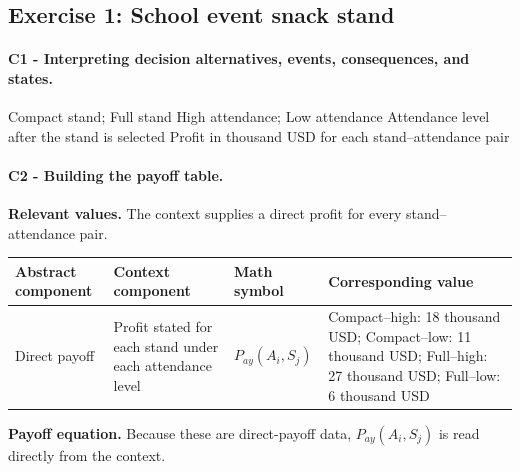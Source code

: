 	
	\subsection{Exercise 1: School event snack stand}
	\label{sec:problem1-school-event-snack-stand-c1-c2}
	
	\paragraph*{C1 - Interpreting decision alternatives, events, consequences, and states.}
	\label{subsec:problem1-school-event-snack-stand-c1}
	\DecisionElementsTable
	{Compact stand; Full stand}
	{High attendance; Low attendance}
	{Attendance level after the stand is selected}
	{Profit in thousand USD for each stand--attendance pair}
	
	
	\paragraph*{C2 - Building the payoff table.}
	\label{subsec:problem1-school-event-snack-stand-c2}
	\textbf{Relevant values.} The context supplies a direct profit for every stand--attendance pair.
	\begin{center}
		\small
		\begin{tabularx}{\textwidth}{LLLL}
			\toprule
			Abstract component & Context component & Math symbol & Corresponding value \\
			\midrule
			Direct payoff & Profit stated for each stand under each attendance level & $P_{ay}(A_i,S_j)$ & Compact--high: 18 thousand USD; Compact--low: 11 thousand USD; Full--high: 27 thousand USD; Full--low: 6 thousand USD \\
			\bottomrule
		\end{tabularx}
	\end{center}
	\textbf{Payoff equation.} Because these are direct-payoff data, $P_{ay}(A_i,S_j)$ is read directly from the context.


